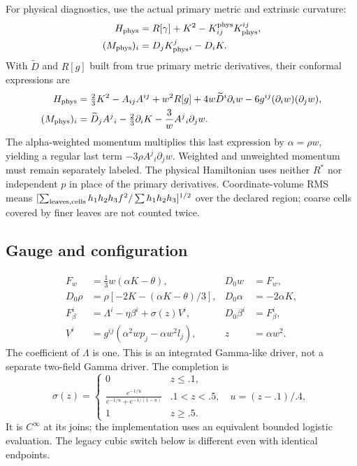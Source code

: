 \documentclass[11pt,letterpaper]{article}
\newcommand{\D}{D_0}\newcommand{\TF}{\operatorname{TF}}\newcommand{\tr}{\operatorname{tr}}
\begin{document}
For physical diagnostics, use the actual primary metric and extrinsic curvature:
\begin{align}
H_{\rm phys}&=R[\gamma]+K^2-K^{\rm phys}_{ij}K_{\rm phys}^{ij},\\
(M_{\rm phys})_i&=D_j K_{\rm phys}^j{}_i-D_iK.
\end{align}
With $\widetilde D$ and $R[g]$ built from true primary metric derivatives, their conformal expressions are
\begin{align}
H_{\rm phys}&=\tfrac23K^2-A_{ij}A^{ij}+w^2R[g]
+4w\widetilde D^i\partial_iw-6g^{ij}(\partial_iw)(\partial_jw),\\
(M_{\rm phys})_i&=\widetilde D_jA^j{}_i-\tfrac23\partial_iK
-\frac3w A^j{}_i\partial_jw.
\end{align}
The alpha-weighted momentum multiplies this last expression by $\alpha=\rho w$, yielding a regular last term $-3\rho A^j{}_i\partial_jw$. Weighted and unweighted momentum must remain separately labeled. The physical Hamiltonian uses neither $R^*$ nor independent $p$ in place of the primary derivatives. Coordinate-volume RMS means $[\sum_{\rm leaves,cells}h_1h_2h_3 f^2/\sum h_1h_2h_3]^{1/2}$ over the declared region; coarse cells covered by finer leaves are not counted twice.

\subsection{Gauge and configuration}
\begin{align}
F_w&=\tfrac13w(\alpha K-\theta),&\D w&=F_w,\\
\D\rho&=\rho[-2K-(\alpha K-\theta)/3],&\D\alpha&=-2\alpha K,\\
F_\beta^i&=\Lambda^i-\eta\beta^i+\sigma(z)V^i,&\D\beta^i&=F_\beta^i,\\
V^i&=g^{ij}(\alpha^2wp_j-\alpha w^2l_j),&z&=\alpha w^2.
\end{align}
The coefficient of $\Lambda$ is one. This is an integrated Gamma-like driver, not a separate two-field Gamma driver. The completion is
\begin{equation}
\sigma(z)=\begin{cases}0&z\le .1,\\
\displaystyle\frac{e^{-1/u}}{e^{-1/u}+e^{-1/(1-u)}}&.1<z<.5,\quad u=(z-.1)/.4,\\
1&z\ge .5.
\end{cases}
\end{equation}
It is $C^\infty$ at its joins; the implementation uses an equivalent bounded logistic evaluation. The legacy cubic switch below is different even with identical endpoints.
\end{document}
